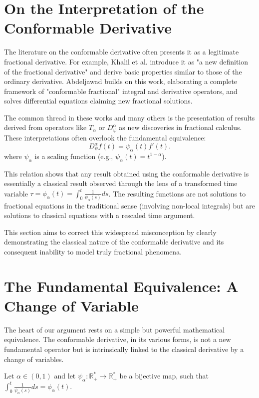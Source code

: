 \documentclass[preprint,12pt]{elsarticle}
\newcommand{\R}{\mathbb {R}}
\begin{document}
\section{On the Interpretation of the Conformable Derivative}
The literature on the conformable derivative often presents it as a legitimate fractional derivative. For example, Khalil et al. \cite{3} introduce it as "a new definition of the fractional derivative" and derive basic properties similar to those of the ordinary derivative. Abdeljawad \cite{abdeljawad2015} builds on this work, elaborating a complete framework of "conformable fractional" integral and derivative operators, and solves differential equations claiming new fractional solutions.

The common thread in these works and many others is the presentation of results derived from operators like $T_\alpha$ or $D_{\psi}^{\alpha}$ as new discoveries in fractional calculus. These interpretations often overlook the fundamental equivalence:
\begin{equation}
D^{\alpha}_{\psi} f(t) = \psi_{\alpha}(t) f'(t).
\end{equation}
where $ \psi_{\alpha} $ is a scaling function (e.g., $ \psi_{\alpha}(t)=t^{1-\alpha}$).

This relation shows that any result obtained using the conformable derivative is essentially a classical result observed through the lens of a transformed time variable $\tau = \phi_{\alpha}(t) = \int_0^t \frac{1}{\psi_{\alpha}(s)} ds$. The resulting functions are not solutions to fractional equations in the traditional sense (involving non-local integrals) but are solutions to classical equations with a rescaled time argument.

This section aims to correct this widespread misconception by clearly demonstrating the classical nature of the conformable derivative and its consequent inability to model truly fractional phenomena.

\section{The Fundamental Equivalence: A Change of Variable}
The heart of our argument rests on a simple but powerful mathematical equivalence. The conformable derivative, in its various forms, is not a new fundamental operator but is intrinsically linked to the classical derivative by a change of variables.

Let $\alpha\in (0,1)$ and let $\psi_{\alpha}:\R_+^*\to \R_+^*$ be a bijective map, such that $\int_{0}^{t}{\frac{1}{\psi_{\alpha}(s)}ds}=\phi_{\alpha}(t).$
\end{document}
